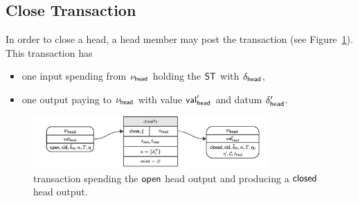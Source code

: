 \subsection{Close Transaction}\label{sec:close-tx}

In order to close a head, a head member may post the \mtxClose{} transaction
(see Figure~\ref{fig:closeTx}). This transaction has
\begin{itemize}
	\item one input spending from $\nu_\mathsf{head}$ holding the $\mathsf{ST}$ with $\delta_{\mathsf{head}}$,
	\item one output paying to $\nu_\mathsf{head}$ with value $\mathsf{val}_{\mathsf{head}}'$ and
	      datum $\delta_{\mathsf{head}}'$.
\end{itemize}

\begin{figure}[h]
	\centering
	\includegraphics[width=0.8\textwidth]{figures/closeTx.pdf}
	\caption{\mtxClose{} transaction spending the $\mathsf{open}$ head output and producing a $\mathsf{closed}$ head output.}\label{fig:closeTx}
\end{figure}

